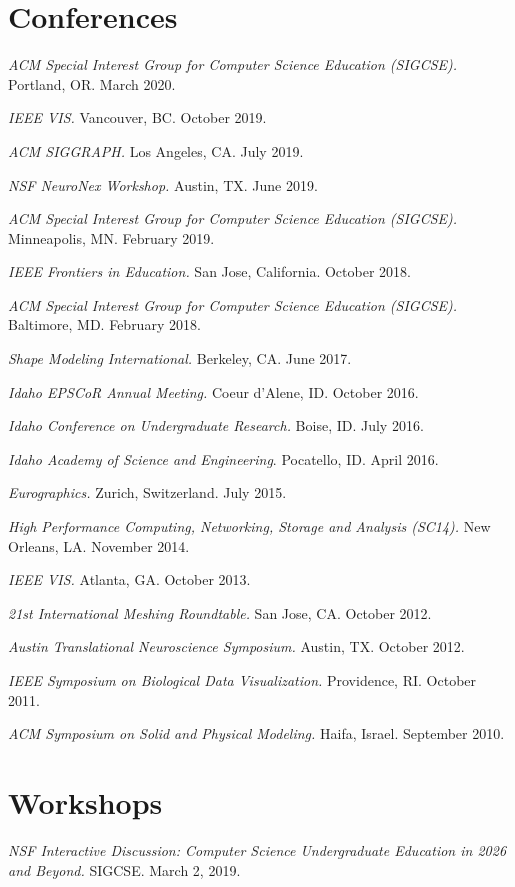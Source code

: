 \documentclass[margin,line]{res}
\begin{document}
\begin{resume}
\section{\sc Conferences}
\textit{ACM Special Interest Group for Computer Science Education (SIGCSE).} Portland, OR. March 2020.

\textit{IEEE VIS.} Vancouver, BC. October 2019.

\textit{ACM SIGGRAPH.} Los Angeles, CA. July 2019.

\textit{NSF NeuroNex Workshop.} Austin, TX. June 2019.

\textit{ACM Special Interest Group for Computer Science Education (SIGCSE).} Minneapolis, MN. February 2019.

\textit{IEEE Frontiers in Education.} San Jose, California. October 2018.

\textit{ACM Special Interest Group for Computer Science Education (SIGCSE).} Baltimore, MD. February 2018.

\textit{Shape Modeling International.} Berkeley, CA. June 2017.

\textit{Idaho EPSCoR Annual Meeting.} Coeur d'Alene, ID. October 2016.

\textit{Idaho Conference on Undergraduate Research.} Boise, ID. July 2016.

\textit{Idaho Academy of Science and Engineering}. Pocatello, ID. April 2016.

\textit{Eurographics.} Zurich, Switzerland. July 2015.

\textit{High Performance Computing, Networking, Storage and Analysis (SC14).} New Orleans, LA. November 2014.

\textit{{IEEE VIS}.} Atlanta, GA. October 2013.

\textit{21st International Meshing Roundtable.} San Jose, CA. October 2012.

\textit{Austin Translational Neuroscience Symposium.} Austin, TX. October 2012.

\textit{IEEE Symposium on Biological Data Visualization.} Providence, RI. October 2011.

\textit{ACM Symposium on Solid and Physical Modeling.} Haifa, Israel. September 2010.

\section{\sc Workshops}

\textit{NSF Interactive Discussion: Computer Science Undergraduate Education in 2026 and Beyond.} SIGCSE. March 2, 2019.


\end{resume}
\end{document}
